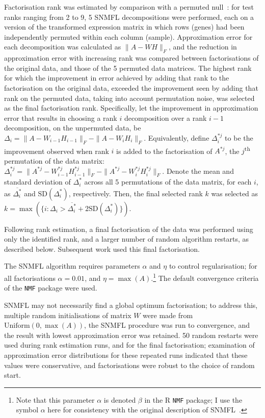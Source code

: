 \documentclass[dissertation.tex]{subfiles}
\begin{document}
Factorisation rank was estimated by comparison with a permuted null~\cite{Frigyesi2008}: for test ranks ranging from 2 to 9, 5 \gls{SNMFL} decompositions were performed, each on a version of the transformed expression matrix in which rows (genes) had been independently permuted within each column (sample).  Approximation error for each decomposition was calculated as $\|A - W H\|_F$, and the reduction in approximation error with increasing rank was compared between factorisations of the original data, and those of the 5 permuted data matrices.  The highest rank for which the improvement in error achieved by adding that rank to the factorisation on the original data, exceeded the improvement seen by adding that rank on the permuted data, taking into account permutation noise, was selected as the final factorisation rank.  Specifically, let the improvement in approximation error that results in choosing a rank $i$ decomposition over a rank $i-1$ decomposition, on the unpermuted data, be $\Delta_i = \|A - W_{i-1} H_{i-1}\|_F - \|A - W_{i} H_{i}\|_F$.  Equivalently, define $\Delta^{*j}_i$ to be the improvement observed when rank $i$ is added to the factorisation of $A^{*j}$, the $j$\textsuperscript{th} permutation of the data matrix: $\Delta^{*j}_i = \|A^{*j} - W^{*j}_{i-1} H^{*j}_{i-1}\|_F - \|A^{*j} - W^{*j}_{i} H^{*j}_{i}\|_F$.  Denote the mean and standard deviation of $\Delta^{*}_i$ across all 5 permutations of the data matrix, for each $i$, as $\overline{\Delta^{*}_i}$ and $\text{SD}(\Delta^{*}_i)$, respectively.  Then, the final selected rank $k$ was selected as $k = \max(\{i : \Delta_i > \overline{\Delta^{*}_i} + 2 \text{SD}(\Delta^{*}_i)\})$.

Following rank estimation, a final factorisation of the data was performed using only the identified rank, and a larger number of random algorithm restarts, as described below.  Subsequent work used this final factorisation.

The \gls{SNMFL} algorithm requires parameters $\alpha$ and $\eta$ to control regularisation; for all factorisations $\alpha = 0.01$, and $\eta = \max(A)$.\footnote{Note that this parameter $\alpha$ is denoted $\beta$ in the R \texttt{NMF} package; I use the symbol $\alpha$ here for consistency with the original description of \gls{SNMFL}~\cite{Kim2007}.}  The default convergence criteria of the \texttt{NMF} package were used.

\gls{SNMFL} may not necessarily find a global optimum factorisation; to address this, multiple random initialisations of matrix $W$ were made from $\text{Uniform}(0, \max(A))$, the \gls{SNMFL} procedure was run to convergence, and the result with lowest approximation error was retained.  50 random restarts were used during rank estimation runs, and  for the final factorisation; examination of approximation error distributions for these repeated runs indicated that these values were conservative, and factorisations were robust to the choice of random start.
\end{document}
